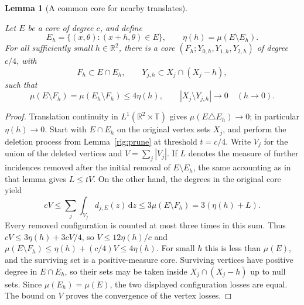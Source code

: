 \documentclass[11pt]{amsart}
\newcommand{\R}{\mathbb R}
\newcommand{\dd}{\,\mathrm d}
\newtheorem{lemma}[theorem]{Lemma}
\theoremstyle{definition}
\theoremstyle{remark}
\numberwithin{equation}{section}
\providecommand{\lean}[1]{}
\providecommand{\leanok}{}
\begin{document}
\begin{lemma}[A common core for nearby translates]\label{rig:common-core}
\lean{Auto.rig_common_core}
\leanok
Let $E$ be a core of degree $c$, and define
\[
 E_h=\{(x,\theta):(x+h,\theta)\in E\},
 \qquad \eta(h)=\mu(E\setminus E_h).
\]
For all sufficiently small $h\in\R^2$, there is a core
$(F_h;Y_{0,h},Y_{1,h},Y_{2,h})$ of degree $c/4$, with
\[
 F_h\subset E\cap E_h,\qquad
 Y_{j,h}\subset X_j\cap(X_j-h),
\]
such that
\[
 \mu(E\setminus F_h)=\mu(E_h\setminus F_h)\le4\eta(h),
 \qquad |X_j\setminus Y_{j,h}|\longrightarrow0\quad(h\to0).
\]
\end{lemma}
\begin{proof}
Translation continuity in $L^1(\R^2\times \mathbb T)$ gives
$\mu(E\triangle E_h)\to0$; in particular $\eta(h)\to0$.
Start with $E\cap E_h$ on the original vertex sets $X_j$, and perform
the deletion process from Lemma~\ref{rig:prune} at threshold $t=c/4$.
Write $V_j$ for the union of the deleted vertices and
$V=\sum_j|V_j|$. If $L$ denotes the measure of further incidences removed
after the initial removal of $E\setminus E_h$, the same accounting as
in that lemma gives $L\le tV$.
On the other hand, the degrees in the original core yield
\[
 cV\le\sum_j\int_{V_j}d_{j,E}(z)\dd z
 \le3\mu(E\setminus F_h)=3(\eta(h)+L).
\]
Every removed configuration is counted at most three times in this sum.
Thus $cV\le3\eta(h)+3cV/4$, so
$V\le12\eta(h)/c$ and
$\mu(E\setminus F_h)\le\eta(h)+(c/4)V\le4\eta(h)$.
For small $h$ this is less than $\mu(E)$, and the surviving set is a
positive-measure core. Surviving vertices have positive degree in
$E\cap E_h$, so their sets may be taken inside
$X_j\cap(X_j-h)$ up to null sets. Since $\mu(E_h)=\mu(E)$, the two
displayed configuration losses are equal. The bound on $V$ proves the
convergence of the vertex losses.
\end{proof}
\end{document}
